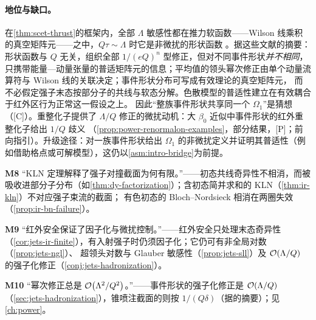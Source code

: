 \paragraph{地位与缺口。}
在\cref{thm:scet-thrust}的框架内，全部 $\Lambda$ 敏感性都在推力软函数——Wilson 线乘积的真空矩阵元——之中，$Q\tau\sim\Lambda$ 时它是非微扰的形状函数
\cite{Korchemsky:1994is,Korchemsky:1999kt,Bauer:2003di,Lee:2006nr,Bauer:2008dt}。据这些文献的摘要：形状函数与 $Q$ 无关，组织全部 $1/(eQ)^n$ 型修正，但对不同事件形状\emph{并不相同}，
只携带能量—动量张量的普适矩阵元的信息\cite{Korchemsky:1999kt}；平均值的领头幂次修正由单个动量流算符与 Wilson 线的关联决定\cite{Lee:2006nr}；事件形状分布可写成有效理论的真空矩阵元，
而不必假定强子末态按部分子的共线与软态分解\cite{Bauer:2008dt}。色散模型的普适性建立在有效耦合于红外区行为正常这一假设之上\cite{DokshitzerWebber1995}。
因此“整族事件形状共享同一个 $\Omega_1$”是猜想（[C]）。重整化子提供了 $\Lambda/Q$ 修正的微扰动机：大 $\beta_0$ 近似中事件形状的红外重整化子给出 $1/Q$ 歧义
（\cref{prop:power-renormalon-examples}，部分结果，[P]；前向指引）。升级途径：对一族事件形状给出 $\Omega_1$ 的非微扰定义并证明其普适性（例如借助格点或可解模型），这仍以\cref{asm:intro-bridge}为前提。
\begin{tcolorbox}[enhanced,breakable,title=常见误解（M8、M9、M10）,fonttitle=\bfseries,
  colback=gray!3!white,colframe=gray!55!black,boxrule=0.6pt,arc=2pt,
  left=5pt,right=5pt,top=3pt,bottom=3pt,before skip=6pt,after skip=6pt]
\textbf{M8} “KLN 定理解释了强子对撞截面为何有限。”——初态共线奇异性不相消，而被吸收进部分子分布（如\cref{thm:dy-factorization}）；含初态简并求和的 KLN（\cref{thm:ir-kln}）不对应强子束流的截面；
有色初态的 Bloch--Nordsieck 相消在两圈失效（\cref{prop:ir-bn-failure}）。\par
\textbf{M9} “红外安全保证了因子化与微扰控制。”——红外安全只处理末态奇异性（\cref{cor:jets-ir-finite}），有入射强子时仍须因子化；它仍可有非全局对数（\cref{prop:jets-ngl}）、
超领头对数与 Glauber 敏感性（\cref{prop:jets-sll}）及 $\mathcal{O}\!\left(\Lambda/Q\right)$ 的强子化修正（\cref{conj:jets-hadronization}）。\par
\textbf{M10} “幂次修正总是 $\mathcal{O}\!\left(\Lambda^2/Q^2\right)$。”——事件形状的强子化修正是 $\mathcal{O}\!\left(\Lambda/Q\right)$（\cref{sec:jets-hadronization}），锥喷注截面的则按 $1/(Q\delta)$（据\cite{Korchemsky:1994is}的摘要）；见\cref{ch:power}。
\end{tcolorbox}

